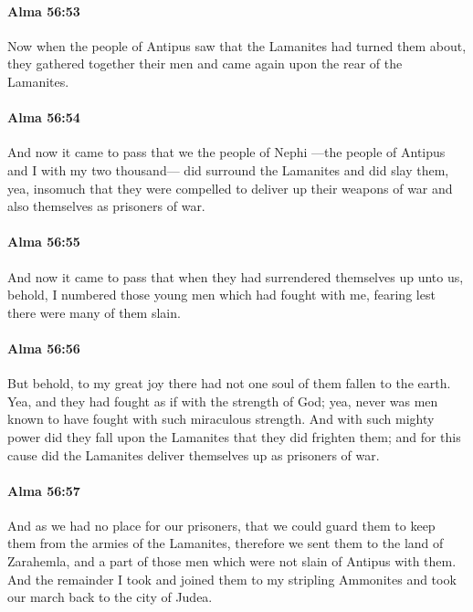 		\paragraph{Alma 56:53} %
			\label{ALMA-56-53}

			Now when the people of Antipus saw that the Lamanites had turned them about,
			they gathered together their men and came again upon the rear of the Lamanites.

		\paragraph{Alma 56:54} %
			\label{ALMA-56-54}

			And now it came to pass that we the people of Nephi
			---the people of Antipus and I with my two thousand---
			did surround the Lamanites and did slay them,
			yea, insomuch that they were compelled to deliver up their weapons of war
			and also themselves as prisoners of war.

		\paragraph{Alma 56:55} %
			\label{ALMA-56-55}

			And now it came to pass that when they had surrendered themselves up unto us,
			behold, I numbered those young men which had fought with me,
			fearing lest there were many of them slain.

		\paragraph{Alma 56:56} %
			\label{ALMA-56-56}

			But behold, to my great joy there had not one soul of them fallen to the earth.
			Yea, and they had fought as if with the strength of God;
			yea, never was men known to have fought with such miraculous strength.
			And with such mighty power did they fall upon the Lamanites
			that they did frighten them;
			and for this cause did the Lamanites deliver themselves up as prisoners of war.

		\paragraph{Alma 56:57} %
			\label{ALMA-56-57}

			And as we had no place for our prisoners,
			that we could guard them to keep them from the armies of the Lamanites,
			therefore we sent them to the land of Zarahemla,
			and a part of those men which were not slain of Antipus with them.
			And the remainder I took and joined them to my stripling Ammonites
			and took our march back to the city of Judea.

